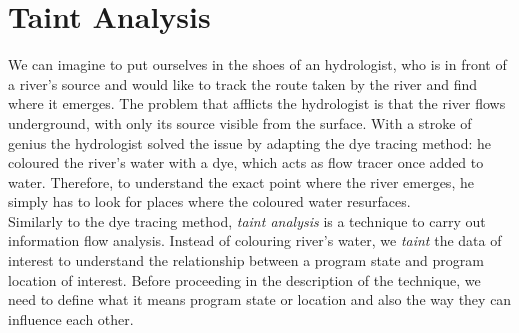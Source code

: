 \documentclass[LaM,binding=0.6cm]{sapthesis}
\begin{document}
\section{Taint Analysis}
\label{ch:taintanalysis}
We can imagine to put ourselves in the shoes of an hydrologist, who is in front of a river's source and would like to track the route taken by the river and find where it emerges. The problem that afflicts the hydrologist is that the river flows underground, with only its source visible from the surface. With a stroke of genius the hydrologist solved the issue by adapting the dye tracing method: he coloured the river's water with a dye, which acts as flow tracer once added to water. Therefore, to understand the exact point where the river emerges, he simply has to look for places where the coloured water resurfaces.\\

Similarly to the dye tracing method, \textit{taint analysis} is a technique to carry out information flow analysis. Instead of colouring river's water, we \textit{taint} the data of interest to understand the relationship between a program state and program location of interest\cite{Practicalbinaryanalysis}. Before proceeding in the description of the technique, we need to define what it means program state or location and also the way they can influence each other.\\
\end{document}
